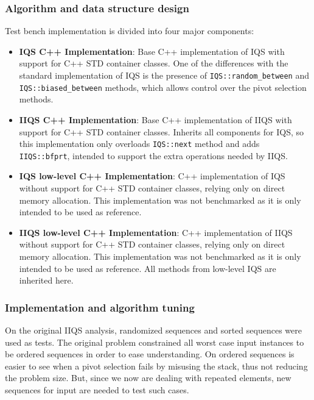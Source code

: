 \subsubsection{Algorithm and data structure design}
Test bench implementation is divided into four major components:\\

\begin{itemize}
    \item{
        \textbf{IQS C++ Implementation}: Base C++ implementation of IQS with support for C++ STD container classes. One of the differences with the standard implementation of IQS is the presence of \texttt{IQS::random\_between} and \texttt{IQS::biased\_between} methods, which allows control over the pivot selection methods.
    }
    \item{
        \textbf{IIQS C++ Implementation}: Base C++ implementation of IIQS with support for C++ STD container classes. Inherits all components for IQS, so this implementation only overloads \texttt{IQS::next} method and adds \texttt{IIQS::bfprt}, intended to support the extra operations needed by IIQS.
    }
    \item{
        \textbf{IQS low-level C++ Implementation}: C++ implementation of IQS without support for C++ STD container classes, relying only on direct memory allocation. This implementation was not benchmarked as it is only intended to be used as reference.
    }
    \item{
        \textbf{IIQS low-level C++ Implementation}: C++ implementation of IIQS without support for C++ STD container classes, relying only on direct memory allocation. This implementation was not benchmarked as it is only intended to be used as reference. All methods from low-level IQS are inherited here.
    }
\end{itemize}

\subsubsection{Implementation and algorithm tuning}
On the original IIQS analysis, randomized sequences and sorted sequences were used as tests. The original problem constrained all worst case input instances to be ordered sequences in order to ease understanding. On ordered sequences is easier to see when a pivot selection fails by misusing the stack, thus not reducing the problem size. But, since we now are dealing with repeated elements, new sequences for input are needed to test such cases.\\

